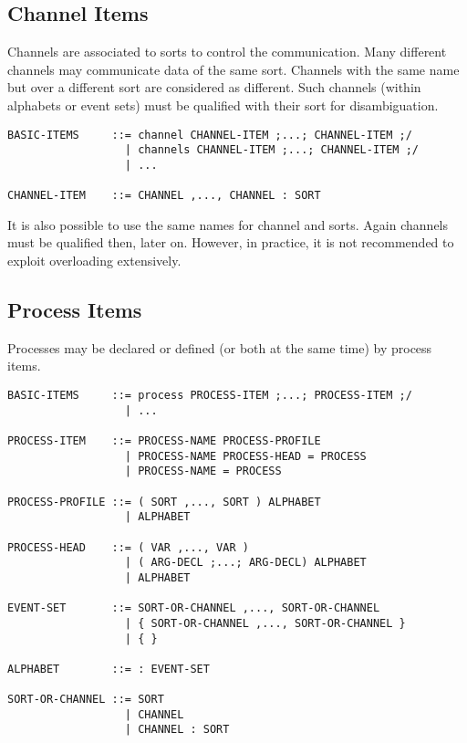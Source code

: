 \documentclass{article}
\begin{document}
\subsection{Channel Items}

Channels are associated to sorts to control the communication. Many different
channels may communicate data of the same sort. Channels with the same name
but over a different sort are considered as different. Such channels (within
alphabets or event sets) must be qualified with their sort for
disambiguation.

\begin{verbatim}
BASIC-ITEMS     ::= channel CHANNEL-ITEM ;...; CHANNEL-ITEM ;/
                  | channels CHANNEL-ITEM ;...; CHANNEL-ITEM ;/
                  | ...

CHANNEL-ITEM    ::= CHANNEL ,..., CHANNEL : SORT
\end{verbatim}

It is also possible to use the same names for channel and sorts. Again
channels must be qualified then, later on. However, in practice, it is not
recommended to exploit overloading extensively.

\subsection{Process Items}

Processes may be declared or defined (or both at the same time) by process items.

\begin{verbatim}
BASIC-ITEMS     ::= process PROCESS-ITEM ;...; PROCESS-ITEM ;/
                  | ...

PROCESS-ITEM    ::= PROCESS-NAME PROCESS-PROFILE
                  | PROCESS-NAME PROCESS-HEAD = PROCESS
                  | PROCESS-NAME = PROCESS

PROCESS-PROFILE ::= ( SORT ,..., SORT ) ALPHABET
                  | ALPHABET

PROCESS-HEAD    ::= ( VAR ,..., VAR )
                  | ( ARG-DECL ;...; ARG-DECL) ALPHABET
                  | ALPHABET

EVENT-SET       ::= SORT-OR-CHANNEL ,..., SORT-OR-CHANNEL
                  | { SORT-OR-CHANNEL ,..., SORT-OR-CHANNEL }
                  | { }

ALPHABET        ::= : EVENT-SET

SORT-OR-CHANNEL ::= SORT
                  | CHANNEL
                  | CHANNEL : SORT

\end{verbatim}
\end{document}
